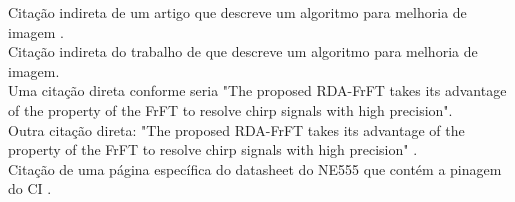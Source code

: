 \documentclass{article}
\begin{document}
Citação indireta de um artigo que descreve um algoritmo para melhoria de imagem \cite{janani_image_2015}. \\

Citação indireta do trabalho de  que descreve um algoritmo para melhoria de imagem. \\

Uma citação direta conforme  seria "The proposed RDA-FrFT takes its advantage of the property of the FrFT to resolve chirp signals with high precision". \\

Outra citação direta: "The proposed RDA-FrFT takes its advantage of the property of the FrFT to resolve chirp signals with high precision" \cite{el-mashed_target_2012}. \\

Citação de uma página específica do datasheet do NE555 que contém a pinagem do CI \cite[p. 3]{datasheet_555}.

%

\end{document}
